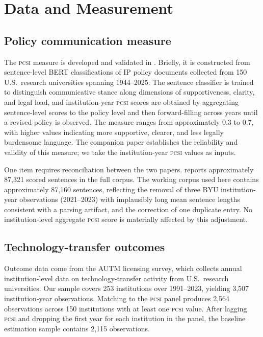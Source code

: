 \documentclass[12pt]{article}
\newcommand{\PCSI}{\textsc{pcsi}}
\begin{document}
\section{Data and Measurement}
\label{sec:data}

\subsection*{Policy communication measure}

The \PCSI{} measure is developed and validated in \citet{sharma2026pcsi}. Briefly, it
is constructed from sentence-level BERT classifications of IP policy documents collected
from 150 U.S.\ research universities spanning 1944--2025. The sentence classifier is
trained to distinguish communicative stance along dimensions of supportiveness, clarity,
and legal load, and institution-year \PCSI{} scores are obtained by aggregating
sentence-level scores to the policy level and then forward-filling across years until
a revised policy is observed. The measure ranges from approximately 0.3 to 0.7, with
higher values indicating more supportive, clearer, and less legally burdensome language.
The companion paper establishes the reliability and validity of this measure; we take
the institution-year \PCSI{} values as inputs.

One item requires reconciliation between the two papers. \citet{sharma2026pcsi} reports
approximately 87,321 scored sentences in the full corpus. The working corpus used here
contains approximately 87,160 sentences, reflecting the removal of three BYU institution-year
observations (2021--2023) with implausibly long mean sentence lengths consistent with
a parsing artifact, and the correction of one duplicate entry. No institution-level
aggregate \PCSI{} score is materially affected by this adjustment.

\subsection*{Technology-transfer outcomes}

Outcome data come from the AUTM licensing survey, which collects annual institution-level
data on technology-transfer activity from U.S.\ research universities. Our sample covers
253 institutions over 1991--2023, yielding 3,507 institution-year observations. Matching
to the \PCSI{} panel produces 2,564 observations across 150 institutions with at least
one \PCSI{} value. After lagging \PCSI{} and dropping the first year for each institution
in the panel, the baseline estimation sample contains 2,115 observations.
\end{document}
